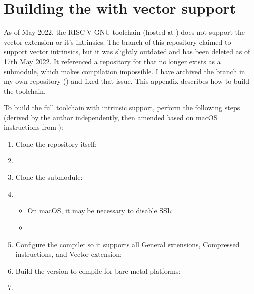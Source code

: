 \chapter{Building the  with vector support}\label{appx:building_rvv_gcc_toolchain}

As of May 2022, the RISC-V GNU toolchain (hosted at ) does not support the vector extension or it's intrinsics.
The  branch of this repository claimed to support vector intrinsics, but it was slightly outdated and has been deleted as of 17th May 2022.
It referenced a repository for  that no longer exists as a submodule, which makes compilation impossible.
I have archived the branch in my own repository () and fixed that issue.
This appendix describes how to build the toolchain.

To build the full toolchain with intrinsic support, perform the following steps (derived by the author independently, then amended based on macOS instructions from ):
\begin{enumerate}
    \item Clone the repository itself:
    \item[\code{\$}] 
    \item Clone the  submodule:
    \item[\code{\$}] 
    \begin{itemize}
        \item On macOS, it may be necessary to disable SSL:
        \item[\code{\$}] 
    \end{itemize}
    \item Configure the compiler so it supports all General extensions, Compressed instructions, and Vector extension:
    \item Build the  version to compile for bare-metal platforms:
    \item[\code{\$}] 
\end{enumerate}
